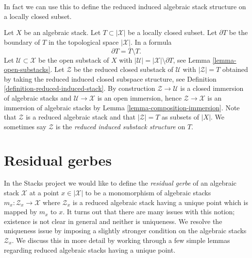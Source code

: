 \noindent
In fact we can use this to define the reduced induced algebraic
stack structure on a locally closed subset.

\begin{remark}
\label{remark-stack-structure-locally-closed-subset}
Let $X$ be an algebraic stack.
Let $T \subset |\mathcal{X}|$ be a locally closed subset.
Let $\partial T$ be the boundary of $T$ in
the topological space $|\mathcal{X}|$. In a formula
$$
\partial T = \overline{T} \setminus T.
$$
Let $\mathcal{U} \subset \mathcal{X}$ be the open substack of $X$ with
$|\mathcal{U}| = |\mathcal{X}| \setminus \partial T$, see
Lemma \ref{lemma-open-substacks}.
Let $\mathcal{Z}$ be the reduced closed substack of $\mathcal{U}$ with
$|\mathcal{Z}| = T$ obtained by taking the reduced induced
closed subspace structure, see
Definition \ref{definition-reduced-induced-stack}.
By construction $\mathcal{Z} \to \mathcal{U}$ is a closed immersion of
algebraic stacks and $\mathcal{U} \to \mathcal{X}$ is an open immersion,
hence $\mathcal{Z} \to \mathcal{X}$ is an immersion of algebraic stacks by
Lemma \ref{lemma-composition-immersion}.
Note that $\mathcal{Z}$ is a reduced algebraic stack and that
$|\mathcal{Z}| = T$ as subsets of $|X|$. We sometimes say
$\mathcal{Z}$ is the {\it reduced induced substack structure} on $T$.
\end{remark}













\section{Residual gerbes}
\label{section-residual-gerbe}

\noindent
In the Stacks project we would like to define the {\it residual gerbe}
of an algebraic stack $\mathcal{X}$ at a point $x \in |\mathcal{X}|$
to be a monomorphism of algebraic stacks
$m_x : \mathcal{Z}_x \to \mathcal{X}$ where $\mathcal{Z}_x$ is a reduced
algebraic stack having a unique point which is mapped by $m_x$ to $x$.
It turns out that there are many issues with this notion; existence is not
clear in general and neither is uniqueness.
We resolve the uniqueness issue by imposing a slightly stronger
condition on the algebraic stacks $\mathcal{Z}_x$.
We discuss this in more detail by working through a few simple lemmas
regarding reduced algebraic stacks having a unique point.

